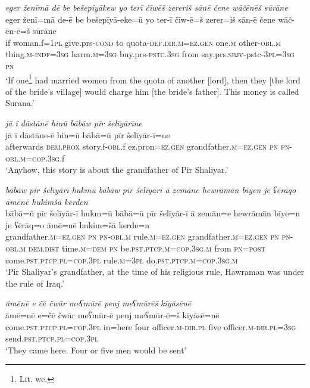 \ea \label{BP.18}
\textit{eger ženīmā dē be bešepīyākew yo terī čīwēš zereriš sānē čene wāčēnēš sūrāne} \\ 
\gll eger ženī=mā de-ē be bešepīyā-eke=ū yo ter-ī čīw-ē=š zerer=iš sān-ē čene wāč-ēn-ē=š sūrāne \\ 
 if woman.f\textsc{=\textsc{1pl}} give.prs\textsc{-cond} to quota\textsc{-def}\textsc{.dir}\textsc{.m}\textsc{=ez.gen} one\textsc{.m} other\textsc{-obl}\textsc{.m} thing\textsc{.m}\textsc{-indf}\textsc{=3sg} harm\textsc{.m}\textsc{=3sg} buy.prs\textsc{-pstc}\textsc{.3sg} from say.prs.\textsc{sbjv-}pstc\textsc{-3pl}\textsc{=3sg} \textsc{pn} \\ 
\glt `If one\footnote{Lit. we.} had married women from the quota of another [lord], then they [the lord of the bride's village] would charge him [the bride’s father]. This money is called Surana.'
\z 
 
\ea \label{BP.20}
\textit{jā ī dāstānē hinū bābāw pīr šelīyārīne} \\ 
\gll jā ī dāstāne-ē hin=ū bābā=ū pīr šelīyār-ī=ne \\ 
 afterwards \textsc{dem.prox} story.f\textsc{-obl}.f ez.pron\textsc{=ez.gen} grandfather\textsc{.m}\textsc{=ez.gen} \textsc{pn} \textsc{pn}\textsc{-obl}\textsc{.m}\textsc{=cop}\textsc{.3sg}.f \\ 
\glt `Anyhow, this story is about the grandfather of Pir Shaliyar.'
\z 
 
\ea \label{BP.21}
\textit{bābāw pīr šelīyārī hukmū bābāw pīr šelīyārī ā zemāne hewrāmān bīyen je ʕērāqo āmēnē hukimšā kerden} \\ 
\gll bābā=ū pīr šelīyār-ī hukm=ū bābā=ū pīr šelīyār-ī ā zemān=e hewrāmān bīye=n je ʕērāq=o āmē=nē hukim=šā kerde=n \\ 
 grandfather\textsc{.m}\textsc{=ez.gen} \textsc{pn} \textsc{pn}\textsc{-obl}\textsc{.m} rule\textsc{.m}\textsc{=ez.gen} grandfather\textsc{.m}\textsc{=ez.gen} \textsc{pn} \textsc{pn}\textsc{-obl}\textsc{.m} \textsc{dem.dist} time\textsc{.m}\textsc{=dem} \textsc{pn} be\textsc{.pst}\textsc{.ptcp}\textsc{.m}\textsc{=cop}\textsc{.3sg}\textsc{.m} from \textsc{pn}\textsc{=\textsc{post}} come\textsc{.pst}\textsc{.ptcp}\textsc{.pl}\textsc{=cop}\textsc{.3pl} rule\textsc{.m}\textsc{=3pl} do\textsc{.pst}\textsc{.ptcp}\textsc{.m}\textsc{=cop}\textsc{.3sg}\textsc{.m} \\ 
\glt `Pir Shaliyar’s grandfather, at the time of his religious rule, Hawraman was under the rule of Iraq.'
\z 
 
\ea \label{BP.23}
\textit{āmēnē e čē čwār meʕmūrē penj meʕmūrēš kīyāsēnē} \\ 
\gll āmē=nē e=čē čwār meʕmūr-ē penj meʕmūr-ē=š kīyāsē=nē \\ 
 come\textsc{.pst}\textsc{.ptcp}\textsc{.pl}\textsc{=cop}\textsc{.3pl} in=here four officer\textsc{.m}\textsc{-dir}\textsc{.pl} five officer\textsc{.m}\textsc{-dir}\textsc{.pl}\textsc{=3sg} send\textsc{.pst}\textsc{.ptcp}\textsc{.pl}\textsc{=cop}\textsc{.3pl} \\ 
\glt `They came here. Four or five men would be sent'
\z 
 
